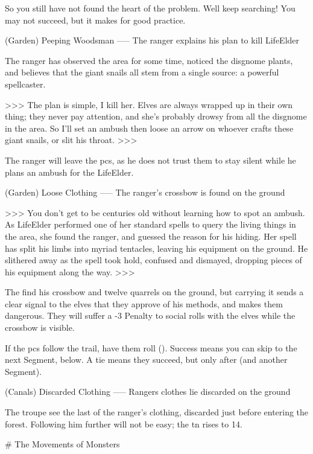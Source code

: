 \begin{speechtext}
  So you still have not found the heart of the problem.
  Well keep searching!
  You may not succeed, but it makes for good practice.
\end{speechtext}

(Garden) Peeping Woodsman
-----
{The ranger explains his plan to kill LifeElder}

The ranger has observed the area for some time, noticed the \gls{disgnome} plants, and believes that the giant snails all stem from a single source: a powerful spellcaster.

>>>
The plan is simple, I kill her.
Elves are always wrapped up in their own thing; they never pay attention, and she's probably drowsy from all the \gls{disgnome} in the area.
So I'll set an ambush then loose an arrow on whoever crafts these giant snails, or slit his throat.
>>>

The ranger will leave the \glspl{pc}, as he does not trust them to stay silent while he plans an ambush for the LifeElder.

(Garden) Loose Clothing
-----
{The ranger's crossbow is found on the ground}

>>>
You don't get to be centuries old without learning how to spot an ambush.
As LifeElder performed one of her standard spells to query the living things in the area, she found the ranger, and guessed the reason for his hiding.
Her spell has split his limbs into myriad tentacles, leaving his equipment on the ground.
He slithered away as the spell took hold, confused and dismayed, dropping pieces of his equipment along the way.
>>>

The find his crossbow and twelve quarrels on the ground, but carrying it sends a clear signal to the elves that they approve of his methods, and makes them dangerous.
They will suffer a -3 Penalty to social rolls with the elves while the crossbow is visible.

If the \glspl{pc} follow the trail, have them roll  (\tn[10]).
Success means you can skip to the next Segment, below.
A tie means they succeed, but only after  (and another Segment).

(Canals) Discarded Clothing
-----
{Rangers clothes lie discarded on the ground}

The troupe see the last of the ranger's clothing, discarded just before entering the forest.
Following him further will not be easy; the \gls{tn} rises to 14.

# The Movements of Monsters

